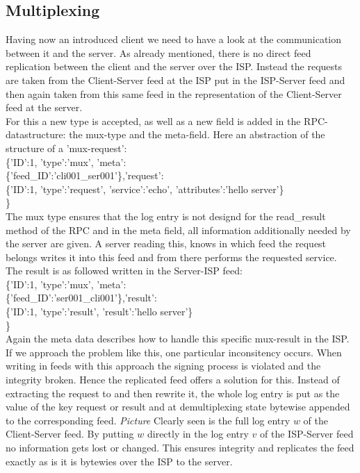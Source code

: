 \subsection{Multiplexing}
Having now an introduced client we need to have a look at the communication between it and the server. As already mentioned, there is no direct feed replication between the client and the server over the ISP. Instead the requests are taken from the Client-Server feed at the ISP put in the ISP-Server feed and then again taken from this same feed in the representation of the Client-Server feed at the server.\\
For this a new type is accepted, as well as a new field is added in the RPC-datastructure: the mux-type and the meta-field. Here an abstraction of the structure of a 'mux-request':\\
\{'ID':1, 'type':'mux', 'meta':\\\{'feed\_ID':'cli001\_ser001'\},'request':\\\{'ID':1, 'type':'request', 'service':'echo', 'attributes':'hello server'\}\\\}\\
The mux type ensures that the log entry is not designd for the read\_result method of the RPC and in the meta field, all information additionally needed by the server are given. A server reading this, knows in which feed the request belongs writes it into this feed and from there performs the requested service. The result is as followed written in the Server-ISP feed:\\
\{'ID':1, 'type':'mux', 'meta':\\\{'feed\_ID':'ser001\_cli001'\},'result':\\\{'ID':1, 'type':'result', 'result':'hello server'\}\\\}\\
Again the meta data describes how to handle this specific mux-result in the ISP.\\
If we approach the problem like this, one particular inconsitency occurs. When writing in feeds with this approach the signing process is violated and the integrity broken. Hence the replicated feed offers a solution for this. Instead of extracting the request to and then rewrite it, the whole log entry is put as the value of the key request or result and at demultiplexing state bytewise appended to the corresponding feed.
\textit{Picture}
Clearly seen is the full log entry $w$ of the Client-Server feed. By putting $w$ directly in the log entry $v$ of the ISP-Server feed no information gets lost or changed. This ensures integrity and replicates the feed exactly as is it is bytewies over the ISP to the server.
